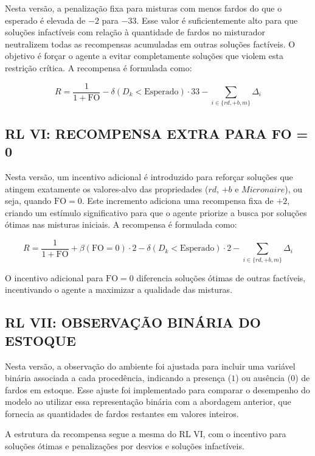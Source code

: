 \documentclass[
    12pt,                %
    openright,           %
    oneside,             %
    a4paper,             %
    english,             %
    spanish,             %
    brazil               %
]{ufscar}
\begin{document}
Nesta versão, a penalização fixa para misturas com menos fardos do que o esperado é elevada de \(-2\) para \(-33\). Esse valor é suficientemente alto para que soluções infactíveis com relação à quantidade de fardos no misturador neutralizem todas as recompensas acumuladas em outras soluções factíveis. O objetivo é forçar o agente a evitar completamente soluções que violem esta restrição crítica. A recompensa é formulada como:

\begin{equation}
R = \frac{1}{1 + \text{FO}} - \delta(D_k < \text{Esperado}) \cdot 33 - \sum_{i \in \{rd, +b, m\}} \Delta_i
\end{equation}

\subsection{RL VI: RECOMPENSA EXTRA PARA FO = 0}

Nesta versão, um incentivo adicional é introduzido para reforçar soluções que atingem exatamente os valores-alvo das propriedades (\(rd\), \(+b\) e \(Micronaire\)), ou seja, quando \(\text{FO} = 0\). Este incremento adiciona uma recompensa fixa de \(+2\), criando um estímulo significativo para que o agente priorize a busca por soluções ótimas nas misturas iniciais. A recompensa é formulada como:

\begin{equation}
R = \frac{1}{1 + \text{FO}} + \beta(\text{FO} = 0) \cdot 2 - \delta(D_k < \text{Esperado}) \cdot 2 - \sum_{i \in \{rd, +b, m\}} \Delta_i
\end{equation}

O incentivo adicional para \(\text{FO} = 0\) diferencia soluções ótimas de outras factíveis, incentivando o agente a maximizar a qualidade das misturas.

\subsection{RL VII: OBSERVAÇÃO BINÁRIA DO ESTOQUE}

Nesta versão, a observação do ambiente foi ajustada para incluir uma variável binária associada a cada procedência, indicando a presença (\(1\)) ou ausência (\(0\)) de fardos em estoque. Esse ajuste foi implementado para comparar o desempenho do modelo ao utilizar essa representação binária com a abordagem anterior, que fornecia as quantidades de fardos restantes em valores inteiros.

A estrutura da recompensa segue a mesma do RL VI, com o incentivo para soluções ótimas e penalizações por desvios e soluções infactíveis.
\end{document}
